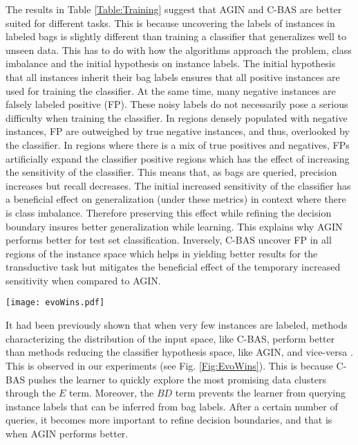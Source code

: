 \documentclass{article}
\begin{document}
The results in Table \ref{Table:Training} suggest that AGIN and C-BAS are better suited for different tasks. This is because uncovering the labels of instances in labeled bags is slightly different than training a classifier that generalizes well to unseen data. This has to do with how the algorithms approach the problem, class imbalance and the initial hypothesis on instance labels. The initial hypothesis that all instances inherit their bag labels ensures that all positive instances are used for training the classifier. At the same time, many negative instances are falsely labeled positive (FP). These noisy labels do not necessarily pose a serious difficulty when training the classifier. In regions densely populated with negative instances, FP are outweighed by true negative instances, and thus, overlooked by the classifier. In regions where there is a mix of true positives and negatives, FPs artificially expand the classifier positive regions which has the effect of increasing the sensitivity of the classifier. This means that, as bags are queried, precision increases but recall decreases. The initial increased sensitivity of the classifier has a beneficial effect on generalization (under these metrics) in context where there is class imbalance. Therefore preserving this effect while refining the decision boundary insures better generalization while learning. This explains why AGIN performs better for test set classification. Inversely, C-BAS uncover FP in all regions of the instance space which helps in yielding better results for the transductive task but mitigates the beneficial effect of the temporary increased sensitivity when compared to AGIN. 



\begin{figure*}[h!]
\centering
\texttt{[image: evoWins.pdf]}
\caption{The number of wins of each method (both metrics) vs. the proportion of queried bag labels.}
\label{Fig:EvoWins}
\end{figure*}

It had been previously shown that when very few instances are labeled, methods characterizing the distribution of the input space, like C-BAS, perform better than methods reducing the classifier hypothesis space, like AGIN, and vice-versa \cite{Wang2015QDR}. This is observed in our experiments (see Fig. \ref{Fig:EvoWins}). This is because C-BAS pushes the learner to quickly explore the most promising data clusters through the $E$ term. Moreover, the $BD$ term prevents the learner from querying instance labels that can be inferred from bag labels. After a certain number of queries, it becomes more important to refine decision boundaries, and that is when AGIN performs better. 
\end{document}
